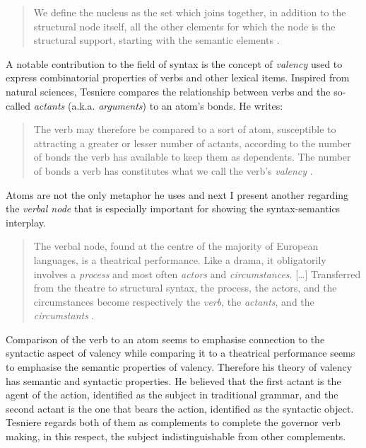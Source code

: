     \begin{quotation}
        We define the nucleus as the set which joins together, in addition to the structural node itself, all the other elements for which the node is the structural support, starting with the semantic elements \citep[38]{Tesniere2015}.
    \end{quotation}

    A notable contribution to the field of syntax is the concept of \textit{valency} used to express combinatorial properties of verbs and other lexical items. Inspired from natural sciences, Tesniere compares the relationship between verbs and the so-called \textit{actants} (a.k.a. \textit{arguments}) to an atom's bonds. He writes:

    \begin{quotation}
        The verb may therefore be compared to a sort of atom, susceptible to attracting a greater or lesser number of actants, according to the number of bonds the verb has available to keep them as dependents. The number of bonds a verb has constitutes what we call the verb’s \textit{valency} \citep[241]{Tesniere2015}.
    \end{quotation}

    Atoms are not the only metaphor he uses and next I present another regarding the \textit{verbal node} that is especially important for showing the syntax-semantics interplay. 

    \begin{quotation}
         The verbal node, found at the centre of the majority of European languages, is a theatrical performance. Like a drama, it obligatorily involves a \textit{process} and most often \textit{actors} and \textit{circumstances}. [\dots] Transferred from the theatre to structural syntax, the process, the actors, and the circumstances become respectively the \textit{verb}, the \textit{actants}, and the \textit{circumstants} \citep[97]{Tesniere2015}.
    \end{quotation}

    Comparison of the verb to an atom seems to emphasise connection to the syntactic aspect of valency while comparing it to a theatrical performance seems to emphasise the semantic properties of valency. Therefore his theory of valency has semantic and syntactic properties. He believed that the first actant is the agent of the action, identified as the subject in traditional grammar, and the second actant is the one that bears the action, identified as the syntactic object. Tesniere regards both of them as complements to complete the governor verb making, in this respect, the subject indistinguishable from other complements. 

